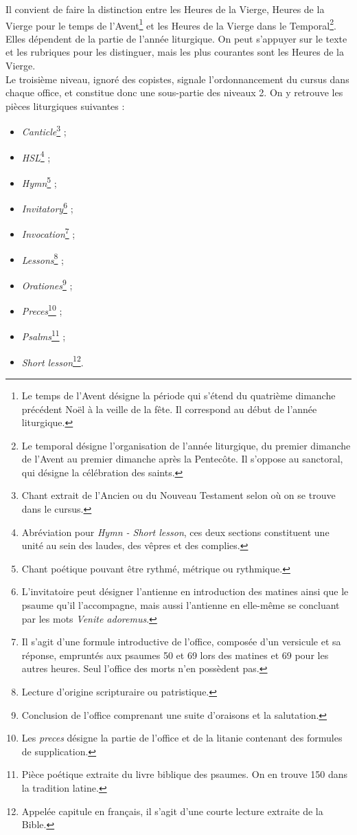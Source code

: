 \documentclass[a4paper,12pt,twoside]{book}
\begin{document}
Il convient de faire la distinction entre les Heures de la Vierge, Heures de la Vierge pour le temps de l'Avent\footnote{Le temps de l'Avent désigne la période qui s'étend du quatrième dimanche précédent Noël à la veille de la fête. Il correspond au début de l'année liturgique.} et les Heures de la Vierge dans le Temporal\footnote{Le temporal désigne l'organisation de l'année liturgique, du premier dimanche de l'Avent au premier dimanche après la Pentecôte. Il s'oppose au sanctoral, qui désigne la célébration des saints.}. Elles dépendent de la partie de l’année liturgique. On peut s’appuyer sur le texte et les rubriques pour les distinguer, mais les plus courantes sont les Heures de la Vierge.\\

Le troisième niveau, ignoré des copistes, signale l'ordonnancement du cursus dans chaque office, et constitue donc une sous-partie des niveaux 2. On y retrouve les pièces liturgiques suivantes : 
\begin{itemize}
    \item \textit{Canticle}\footnote{Chant extrait de l'Ancien ou du Nouveau Testament selon où on se trouve dans le cursus.} ;
    \item \textit{HSL}\footnote{Abréviation pour \og \textit{Hymn - Short lesson}\fg{}, ces deux sections constituent une unité au sein des laudes, des vêpres et des complies.} ;
    \item \textit{Hymn}\footnote{Chant poétique pouvant être rythmé, métrique ou rythmique.} ;
    \item \textit{Invitatory}\footnote{L'invitatoire peut désigner l'antienne en introduction des matines ainsi que le psaume qu'il l'accompagne, mais aussi l'antienne en elle-même se concluant par les mots \og \textit{Venite adoremus}\fg{}.} ;
    \item \textit{Invocation}\footnote{Il s'agit d'une formule introductive de l'office, composée d'un versicule et sa réponse, empruntés aux psaumes 50 et 69 lors des matines et 69 pour les autres heures. Seul l'office des morts n'en possèdent pas.} ;
    \item \textit{Lessons}\footnote{Lecture d'origine scripturaire ou patristique.} ;
    \item \textit{Orationes}\footnote{Conclusion de l'office comprenant une suite d'oraisons et la salutation.} ;
    \item \textit{Preces}\footnote{Les \textit{preces} désigne la partie de l'office et de la litanie contenant des formules de supplication.} ;
    \item \textit{Psalms}\footnote{Pièce poétique extraite du livre biblique des psaumes. On en trouve 150 dans la tradition latine.} ;
    \item \textit{Short lesson}\footnote{Appelée capitule en français, il s'agit d'une courte lecture extraite de la Bible.}.
\end{itemize}
\end{document}
